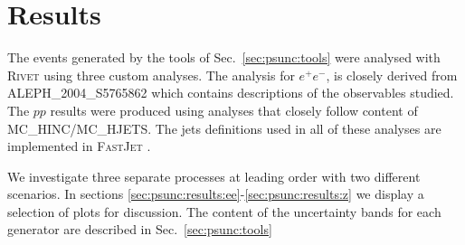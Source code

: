 \section{Results}
\label{sec:psunc:results}
The events generated by the tools of Sec.~\ref{sec:psunc:tools} were analysed with \textsc{Rivet} \cite{Buckley:2010ar} using three custom analyses. The analysis for $e^+e^-$, is closely derived from \textsc{ALEPH\_2004\_S5765862} \cite{Heister:2003aj} which contains descriptions of the observables studied. The $pp$ results were produced using analyses that closely follow content of \textsc{MC\_HINC}/\textsc{MC\_HJETS}. The jets definitions used in all of these analyses are implemented in \textsc{FastJet} \cite{Cacciari:2011ma}.

We investigate three separate processes at leading order with two different scenarios. In sections \ref{sec:psunc:results:ee}-\ref{sec:psunc:results:z} we display a selection of plots for discussion. The content of the uncertainty bands for each generator are described in Sec.~\ref{sec:psunc:tools}

